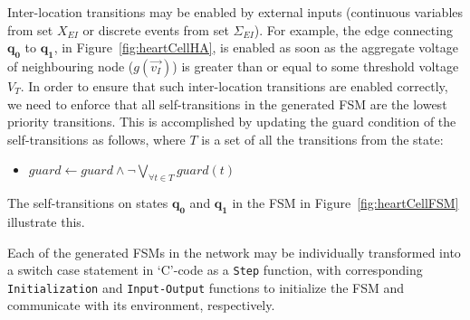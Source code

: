 Inter-location transitions may be enabled by external inputs (continuous 
variables from set $X_{EI}$ or discrete events from set $\Sigma_{EI}$). For 
example, the edge connecting $\mathbf{q_{0}}$ to $\mathbf{q_{1}}$, in 
Figure~\ref{fig:heartCellHA},
is enabled as soon as the aggregate voltage of neighbouring node
($g(\vec{v_{I}})$) is greater than or equal to some threshold voltage
$V_{T}$. In order to ensure that such inter-location transitions are
enabled correctly, we need to enforce that all self-transitions in the
generated \ac{FSM} are the lowest priority transitions. This is
accomplished by updating the guard condition of the self-transitions as
follows, where $T$ is a set of all the transitions from the state:
\begin{itemize}
\item
  $guard \leftarrow guard \wedge \neg \bigvee_{\forall t \in
    T} guard(t)$
\end{itemize}

The self-transitions on states $\mathbf{q_{0}}$ and $\mathbf{q_{1}}$ in the 
\ac{FSM} in Figure~\ref{fig:heartCellFSM} illustrate this.


Each of the generated \acp{FSM} in the network may be individually
transformed into a switch case statement in `C'-code as a \texttt{Step} 
function, with corresponding \texttt{Initialization} and \texttt{Input-Output}
functions to initialize the \ac{FSM} and communicate with its
environment, respectively.


